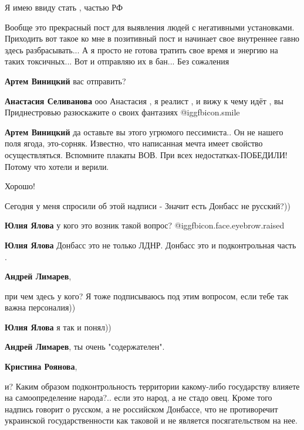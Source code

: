 \begin{itemize}
\begin{itemize}
Я имею ввиду стать , частью РФ


Вообще это прекрасный пост для выявления людей с негативными установками.
Приходить вот такое ко мне в позитивный пост и начинает свое внутреннее гавно
здесь разбрасывать... А я просто не готова тратить свое время и энергию на
таких токсичных... Вот и отправляю их в бан... Без сожаления

\textbf{Артем Виницкий} вас отправить?

\textbf{Анастасия Селиванова} ооо Анастасия , я реалист , и вижу к чему идёт , вы Приднестровью разюскажите о своих фантазиях  @igg{fbicon.smile} 

\textbf{Артем Виницкий} да оставьте вы этого угрюмого пессимиста.. Он не нашего поля ягода, это-сорняк. Известно, что написанная мечта имеет свойство осуществляться. Вспомните плакаты ВОВ. При всех недостатках-ПОБЕДИЛИ! Потому что хотели и верили.
\end{itemize} %

Хорошо!


Сегодня у меня спросили об этой надписи - Значит есть Донбасс не русский?))

\begin{itemize} %
\textbf{Юлия Ялова} у кого это возник такой вопрос?  @igg{fbicon.face.eyebrow.raised} 

\textbf{Юлия Ялова} Донбасс это не только ЛДНР. Донбасс это и подконтрольная часть .

\textbf{Андрей Лимарев}, 

при чем здесь у кого? Я тоже подписываюсь под этим вопросом, если тебе так
важна персоналия))

\textbf{Юлия Ялова} я так и понял))

\textbf{Андрей Лимарев}, ты очень "содержателен".

\textbf{Кристина Роянова}, 

и? Каким образом подконтрольность территории какому-либо государству влияете на
самоопределение народа?.. если это народ, а не стадо овец. Кроме того надпись
говорит о русском, а не российском Донбассе, что не противоречит украинской
государственности как таковой и не является посягательством на нее.


\end{itemize}
\end{itemize}
